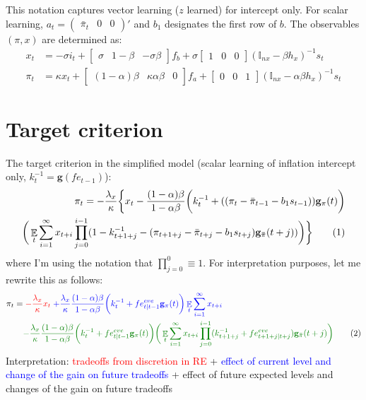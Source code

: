 \documentclass[11pt]{article}
\renewcommand{\[}{\begin{equation}}
\renewcommand{\]}{\end{equation}}
\DeclareMathOperator{\E}{\mathbb{E}}
\newcommand\numberthis{\addtocounter{equation}{1}\tag{\theequation}} %
\begin{document}
\vspace{-0.5cm}

This notation captures vector learning ($z$ learned) for intercept only. For scalar learning, $a_t= \begin{pmatrix} \bar{\pi}_t & 0 & 0\end{pmatrix}' $ and $b_1$ designates the first row of $b$. The observables $(\pi, x)$ are determined as:
\begin{align}
x_t &=  -\sigma i_t + \begin{bmatrix} \sigma & 1-\beta & -\sigma\beta \end{bmatrix} f_b + \sigma \begin{bmatrix} 1 & 0 & 0 \end{bmatrix} (\mathbb{I}_{nx} - \beta h_x)^{-1} s_t \label{A9} \\
\pi_t &= \kappa x_t  + \begin{bmatrix} (1-\alpha)\beta & \kappa\alpha\beta & 0 \end{bmatrix}  f_a + \begin{bmatrix} 0 & 0 & 1 \end{bmatrix}  (\mathbb{I}_{nx} - \alpha \beta h_x)^{-1}  s_t \label{A10}
\end{align}

\section{Target criterion}\label{target_crit_levels}
The target criterion in the simplified model (scalar learning of inflation intercept only, $k_t^{-1} = \mathbf{g}(fe_{t-1})$):
\begin{align*}
\pi_t  = -\frac{\lambda_x}{\kappa}\bigg\{x_t - \frac{(1-\alpha)\beta}{1-\alpha\beta} \bigg(k_t^{-1}+((\pi_t - \bar{\pi}_{t-1}-b_1 s_{t-1}))\mathbf{g}_{\pi}(t) \bigg) \\
\bigg(\E_t\sum_{i=1}^{\infty}x_{t+i}\prod_{j=0}^{i-1}(1-k_{t+1+j}^{-1} - (\pi_{t+1+j} - \bar{\pi}_{t+j}-b_1 s_{t+j})\mathbf{g_{\bar{\pi}}}(t+j)) \bigg)
\bigg\} \numberthis \label{target}
\end{align*}
where I'm using the notation that $\prod_{j=0}^{0} \equiv 1$. For interpretation purposes, let me rewrite this as follows:
\begin{align*}
\pi_t  = & \; \textcolor{red}{-\frac{\lambda_x}{\kappa} x_t} \textcolor{blue}{ \; + \frac{\lambda_x}{\kappa} \frac{(1-\alpha)\beta}{1-\alpha\beta} \bigg(k_t^{-1}+ fe^{eve}_{t|t-1}\mathbf{g}_{\pi}(t) \bigg)\E_t\sum_{i=1}^{\infty}x_{t+i}}  \\
& \textcolor{mygreen}{- \frac{\lambda_x}{\kappa} \frac{(1-\alpha)\beta}{1-\alpha\beta} \bigg(k_t^{-1}+ fe^{eve}_{t|t-1}\mathbf{g}_{\pi}(t) \bigg) \bigg(\E_t\sum_{i=1}^{\infty}x_{t+i}\prod_{j=0}^{i-1}(k_{t+1+j}^{-1} + fe^{eve}_{t+1+j|t+j})\mathbf{g_{\bar{\pi}}}(t+j) \bigg)}
\numberthis \label{target_interpretation}
\end{align*}
Interpretation: \textcolor{red}{tradeoffs from discretion in RE} + \textcolor{blue}{effect of current level and change of the gain on future tradeoffs} + \textcolor{mygreen}{effect of future expected levels and changes of the gain on future tradeoffs}
\end{document}
